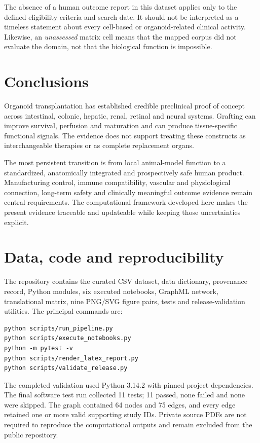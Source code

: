 \documentclass[11pt,a4paper]{article}
\begin{document}
The absence of a human outcome report in this dataset applies only to the defined eligibility criteria and search date. It should not be interpreted as a timeless statement about every cell-based or organoid-related clinical activity. Likewise, an \emph{unassessed} matrix cell means that the mapped corpus did not evaluate the domain, not that the biological function is impossible.

\section{Conclusions}

Organoid transplantation has established credible preclinical proof of concept across intestinal, colonic, hepatic, renal, retinal and neural systems. Grafting can improve survival, perfusion and maturation and can produce tissue-specific functional signals. The evidence does not support treating these constructs as interchangeable therapies or as complete replacement organs.

The most persistent transition is from local animal-model function to a standardized, anatomically integrated and prospectively safe human product. Manufacturing control, immune compatibility, vascular and physiological connection, long-term safety and clinically meaningful outcome evidence remain central requirements. The computational framework developed here makes the present evidence traceable and updateable while keeping those uncertainties explicit.

\section{Data, code and reproducibility}

The repository contains the curated CSV dataset, data dictionary, provenance record, Python modules, six executed notebooks, GraphML network, translational matrix, nine PNG/SVG figure pairs, tests and release-validation utilities. The principal commands are:

\begin{verbatim}
python scripts/run_pipeline.py
python scripts/execute_notebooks.py
python -m pytest -v
python scripts/render_latex_report.py
python scripts/validate_release.py
\end{verbatim}

The completed validation used Python 3.14.2 with pinned project dependencies. The final software test run collected 11 tests; 11 passed, none failed and none were skipped. The graph contained 64 nodes and 75 edges, and every edge retained one or more valid supporting study IDs. Private source PDFs are not required to reproduce the computational outputs and remain excluded from the public repository.
\end{document}

